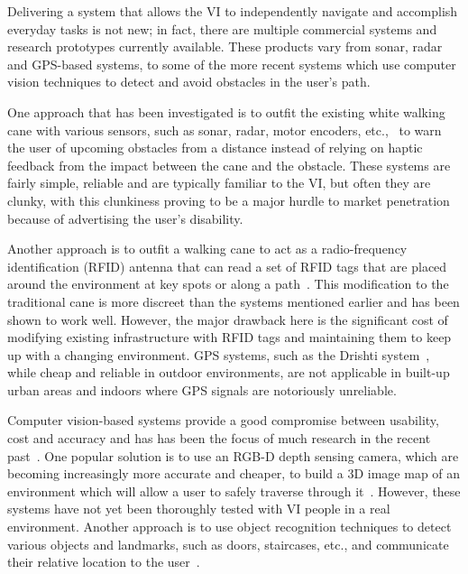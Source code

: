\documentclass[format=sigconf, review=true, screen=true, anonymous=true]{acmart}
\begin{document}

Delivering a system that allows the VI to independently navigate and accomplish everyday tasks is not new; in fact, there are multiple commercial systems and research prototypes currently available. These products vary from sonar, radar and GPS-based systems, to some of the more recent systems which use computer vision techniques to detect and avoid obstacles in the user's path. 

One approach that has been investigated is to outfit the existing white walking cane with various sensors, such as sonar, radar, motor encoders, etc.,~\cite{ulrich1997, marion2008batcane} to warn the user of upcoming obstacles from a distance instead of relying on haptic feedback from the impact between the cane and the obstacle. These systems are fairly simple, reliable and are typically familiar to the VI, but often they are clunky, with this clunkiness proving to be a major hurdle to market penetration because of advertising the user's disability. 

Another approach is to outfit a walking cane to act as a radio-frequency identification (RFID) antenna that can read a set of RFID tags that are placed around the environment at key spots or along a path~\cite{faria2010electronic, willis2005}. This modification to the traditional cane is more discreet than the systems mentioned earlier and has been shown to work well. However, the major drawback here is the significant cost of modifying existing infrastructure with RFID tags and maintaining them to keep up with a changing environment. GPS systems, such as the Drishti system~\cite{ran2004drishti}, while cheap and reliable in outdoor environments, are not applicable in built-up urban areas and indoors where GPS signals are notoriously unreliable. 

Computer vision-based systems provide a good compromise between usability, cost and accuracy and has has been the focus of much research in the recent past~\cite{manduchi2014last}. One popular solution is to use an RGB-D depth sensing camera, which are becoming increasingly more accurate and cheaper, to build a 3D image map of an environment which will allow a user to safely traverse through it~\cite{lee2015, rodriguez2012obstacle}. However, these systems have not yet been thoroughly tested with VI people in a real environment. Another approach is to use object recognition techniques to detect various objects and landmarks, such as doors, staircases, etc., and communicate their relative location to the user~\cite{tian2013b}.%
\end{document}

